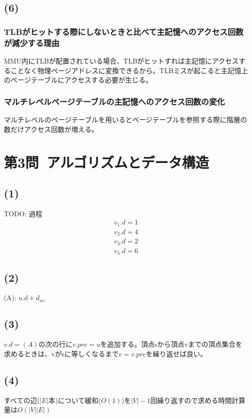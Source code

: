\documentclass[a4paper,12pt,xelatex,ja=standard]{bxjsarticle}
\begin{document}
\subsection*{(6)}
\subsubsection*{TLBがヒットする際にしないときと比べて主記憶へのアクセス回数が減少する理由}
MMU内にTLBが配置されている場合、TLBがヒットすれば主記憶にアクセスすることなく物理ページアドレスに変換できるから。TLBミスが起こると主記憶上のページテーブルにアクセスする必要が生じる。

\subsubsection*{マルチレベルページテーブルの主記憶へのアクセス回数の変化}
マルチレベルのページテーブルを用いるとページテーブルを参照する際に階層の数だけアクセス回数が増える。

\section*{第3問\ アルゴリズムとデータ構造}
\subsection*{(1)}
TODO: 過程\\
\begin{equation*}
  \begin{split}
    v_1.d = 1 \\
    v_2.d = 4 \\
    v_3.d = 2 \\
    v_4.d = 6
  \end{split}
\end{equation*}

\subsection*{(2)}
(A): $u.d + d_{uv}$

\subsection*{(3)}
$v.d = (A)$の次の行に$v.pre = u$を追加する。頂点sから頂点vまでの頂点集合を求めるときは、vがsに等しくなるまで$v = v.pre$を繰り返せば良い。

\subsection*{(4)}
すべての辺($|E|$本)について緩和($O(1)$)を$|V| - 1$回繰り返すので求める時間計算量は$O(|V||E|)$
\end{document}
